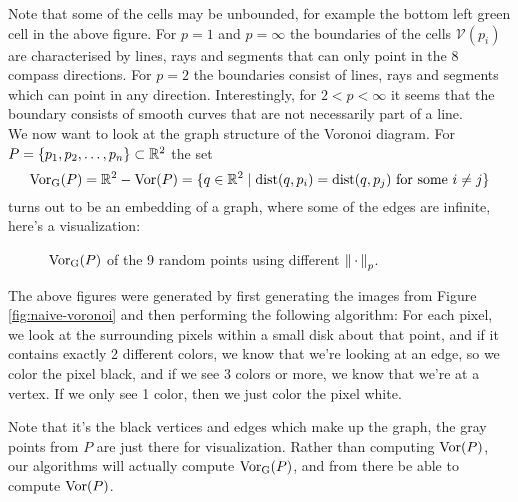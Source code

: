 Note that some of the cells may be unbounded, for example the bottom left green cell in the above figure. For $p = 1$ and $p = \infty$ the boundaries of the cells $\mathcal{V}(p_i)$ are characterised by lines, rays and segments that can only point in the 8 compass directions. For $p = 2$ the boundaries consist of lines, rays and segments which can point in any direction. Interestingly, for $2 < p < \infty$ it seems that the boundary consists of smooth curves that are not necessarily part of a line. \\

We now want to look at the graph structure of the Voronoi diagram. For $P = \{p_1, p_2, \ldots, p_n\} \subset \mathbb{R}^2$ the set
\[
    \operatorname{Vor_{G}}(P) = \mathbb{R}^2 - \operatorname{Vor}(P)
    = \{q \in \mathbb{R}^2 \mid \operatorname{dist}(q, p_i) = \operatorname{dist}(q, p_j) \text{ for some } i \ne j\}
\]
turns out to be an embedding of a graph, where some of the edges are infinite, here's a visualization:
\begin{figure}[H]
    \centering
    \hspace{0mm}
    \caption{$\operatorname{Vor_{G}}(P)$ of the 9 random points using different $\left\lVert \,\cdot\, \right\rVert_p$.}
\end{figure}
The above figures were generated by first generating the images from Figure \ref{fig:naive-voronoi} and then performing the following algorithm: For each pixel, we look at the surrounding pixels within a small disk about that point, and if it contains exactly 2 different colors, we know that we're looking at an edge, so we color the pixel black, and if we see 3 colors or more, we know that we're at a vertex. If we only see 1 color, then we just color the pixel white.

Note that it's the black vertices and edges which make up the graph, the gray points from $P$ are just there for visualization. Rather than computing $\operatorname{Vor}(P)$, our algorithms will actually compute $\operatorname{Vor_{G}}(P)$, and from there be able to compute $\operatorname{Vor}(P)$. \\
